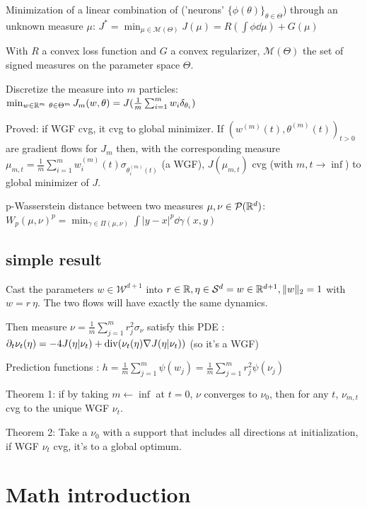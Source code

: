 Minimization of a linear combination of ('neurons' $\{\phi(\theta)\}_{\theta \in \Theta}$) through an unknown measure $\mu$: $J^* = \min_{\mu \in \mathcal{M}(\Theta)} J(\mu) = R(\int \phi \dd \mu) + G(\mu)$

With $R$ a convex loss function and $G$ a convex regularizer, $\mathcal{M}(\Theta)$ the set of signed measures on the parameter space $\Theta$.

Discretize the measure into $m$ particles: $\min_{w \in \mathbb{R}^m \\\ \theta \in \Theta^m} J_m(w, \theta) = J( \frac{1}{m} \sum_{i=1}^{m} w_i \delta_{\theta_i})$

Proved: if WGF cvg, it cvg to global minimizer. If $(w^{(m)}(t), \theta^{(m)}(t))_{t>0}$ are gradient flows for $J_m$ then, with the corresponding measure $\mu_{m,t} = \frac{1}{m} \sum_{i=1}^{m} w^{(m)}_i(t) \sigma_{\theta_i^{(m)}(t)}$ (a WGF), $J(\mu_{m, t})$ cvg (with $m, t \rightarrow \inf$) to global minimizer of $J$.

p-Wasserstein distance between two measures $\mu, \nu \in \mathcal{P}(\mathbb{R}^d)$: $W_p(\mu, \nu)^p = \min_{\gamma \in \Pi(\mu, \nu)} \int |y - x|^p \dd \gamma(x, y)$

\subsection{simple result}

Cast the parameters $w \in \mathcal{W}^{d+1}$ into $r \in \mathbb{R}, \eta \in \mathcal{S}^d = {w \in \mathbb{R}^{d+1}, \lVert w\rVert_2 = 1}$ with $w = r ~ \eta$. The two flows will have exactly the same dynamics.

Then measure $\nu= \frac{1}{m}\sum_{j=1}^{m} r^2_j \sigma_{\nu}$ satisfy this PDE : $\partial_t \nu_t(\eta) = -4 J(\eta | \nu_t) + \operatorname*{div}(\nu_t(\eta) \nabla J(\eta | \nu_t)) $ (so it's a WGF)

Prediction functions : $h = \frac{1}{m} \sum_{j=1}^{m} \psi(w_j) = \frac{1}{m}\sum_{j=1}^{m} r_j^2 \psi(\nu_j)$

Theorem 1: if by taking $m \leftarrow \inf$ at $t=0$, $\nu$ converges to $\nu_0$, then for any $t$, $\nu_{m, t}$ cvg to the unique WGF $\nu_t$.

Theorem 2: Take a $\nu_0$ with a support that includes all directions at initialization, if WGF $\nu_t$ cvg, it's to a global optimum.

\section{Math introduction}

